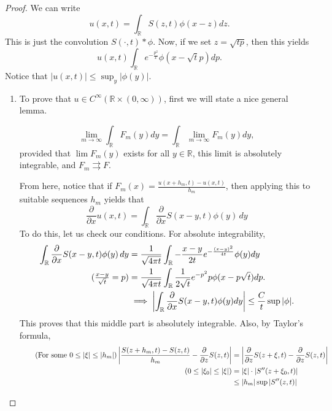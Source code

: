 \begin{proof}
	We can write 
	\[ u(x, t) = \int_{\mathbb{R}} S(z, t) \phi(x - z) dz. \]
	This is just the convolution \( S( \cdot, t) * \phi \). Now, if we set \( z = \sqrt{t p} \), then  this yields
	\[ u(x, t) \int_{\mathbb{R}} e^{- \frac{p^{2}}{x}} \phi(x - \sqrt{t}p) dp. \]
	Notice that \( |u(x, t)| \le \sup_{y}| \phi(y)| \).
	\begin{enumerate}
	
		\item To prove that \( u \in C^{\infty}(\mathbb{R} \times (0, \infty)) \), first we will state a nice general lemma.
			\begin{lemma}
				\[ \lim_{m \to \infty} \int_{\mathbb{R}} F_{m}(y) dy = \int_{\mathbb{R}} \lim_{m \to \infty} F_{m}(y) dy, \]
				provided that \( \lim F_{m}(y) \) exists for all \( y \in \mathbb{R} \), this limit is absolutely integrable, and \( F_{m} \rightrightarrows F \).
			\end{lemma}
			From here, notice that if \( F_{m}(x) = \frac{u(x + h_{m}, t) - u(x, t)}{h_{m}} \), then applying this to suitable sequences \( h_{m} \) yields that
		\[ \frac{\partial}{\partial x}u(x, t) = \int_{\mathbb{R}} \frac{\partial}{\partial x} S(x - y, t) \phi(y) \, dy \]
			To do this, let us check our conditions. For absolute integrability,
			\begin{align*}
				\int_{\mathbb{R}} \frac{\partial}{\partial x} S(x - y, t) \phi(y) \, dy	&= \frac{1}{\sqrt{4 \pi t}} \int_{\mathbb{R}} - \frac{x - y}{2t} e^{- \frac{(x - y)^{2}}{4t}} \phi(y) dy \\
				\tag{\( \frac{x - y}{\sqrt{t}} = p \)}&= \frac{1}{\sqrt{4 \pi t}} \int_{\mathbb{R}} \frac{1}{2 \sqrt{t}} e^{- p^{2}}p \phi(x - p \sqrt{t}) dp. \\
																							&\implies \left| \int_{\mathbb{R}} \frac{\partial}{\partial x} S(x-y, t) \phi(y) dy \right| \le \frac{C}{t} \sup | \phi|.
			\end{align*}
			This proves that this middle part is absolutely integrable. Also, by Taylor's formula,
			\begin{align*}
				\tag{For some \( 0 \le |\xi| \le |h_{m}| \)}\left| \frac{S(z + h_{m}, t) - S(z, t)}{h_{m}} - \frac{\partial}{\partial z}S(z, t) \right|  &= \left| \frac{\partial}{\partial z}S(z + \xi, t) - \frac{\partial}{\partial z} S(z, t) \right| \\
				\tag{\( 0 \le |\xi_{0}| \le | \xi| \)}& = | \xi| \cdot |S''(z + \xi_{0}, t)| \\
				&\le |h_{m}| \sup |S''(z, t)| \\

\end{align*}
\end{enumerate}
\end{proof}
